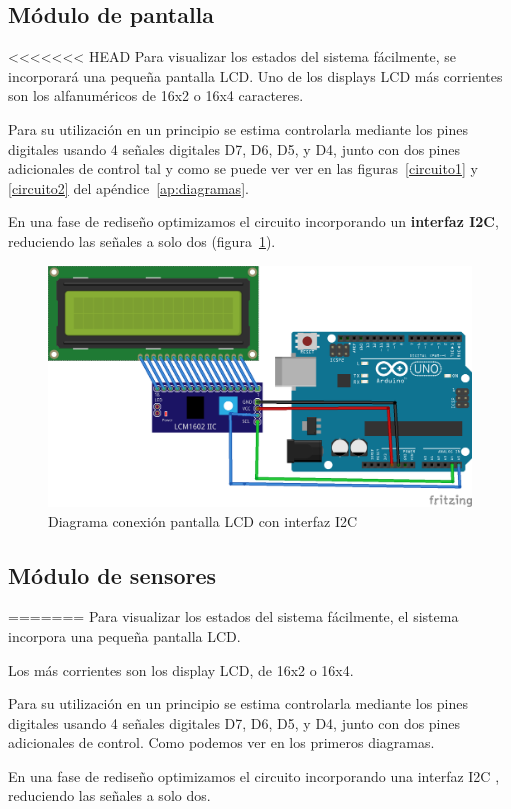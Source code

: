 \begin{itemize}
\subsection{Módulo de pantalla}

<<<<<<< HEAD
Para visualizar los estados del sistema fácilmente, se incorporará una pequeña pantalla LCD. Uno de los displays LCD más corrientes son los alfanuméricos de 16x2 o 16x4 caracteres.

Para su utilización en un principio se estima controlarla mediante los pines digitales usando 4 señales digitales D7, D6, D5, y D4, junto con dos pines adicionales de control tal y como se puede ver ver en las figuras~\ref{circuito1} y \ref{circuito2} del apéndice~\ref{ap:diagramas}.


En una fase de rediseño optimizamos el circuito incorporando un \textbf{interfaz I2C}, reduciendo las señales a solo dos (figura~\ref{fig:lcd_i2c}). 

\begin{figure}[h]
	\centering
	\includegraphics[width=0.7\linewidth]{../images/lcd_i2c}
	\caption[Diagrama conexión pantalla LCD con interfaz I2C]{Diagrama conexión pantalla LCD con interfaz I2C}
	\label{fig:lcd_i2c}
\end{figure}


\subsection{Módulo de sensores}
=======
Para visualizar los estados del sistema fácilmente, el sistema incorpora una pequeña pantalla LCD. 

Los más corrientes son los display LCD, de 16x2 o 16x4.

Para su utilización en un principio se estima controlarla mediante los pines digitales usando 4 señales digitales D7, D6, D5, y D4, junto con dos pines adicionales de control. Como podemos ver en los primeros diagramas.

En una fase de rediseño optimizamos el circuito incorporando una interfaz I2C \cite{I2C}, reduciendo las señales a solo dos. 



\end{itemize}
